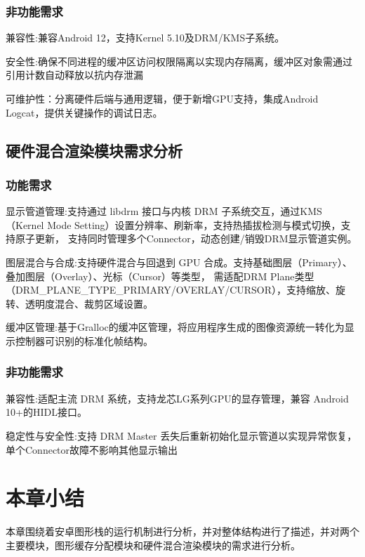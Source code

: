 \subsubsection{非功能需求}
        
    兼容性:兼容Android 12，支持Kernel 5.10及DRM/KMS子系统。
        
    安全性:​确保不同进程的缓冲区访问权限隔离以实现内存隔离，缓冲区对象需通过引用计数自动释放以抗内存泄漏

    可维护性：分离硬件后端与通用逻辑，便于新增GPU支持，集成Android Logcat，提供关键操作的调试日志。

\subsection{硬件混合渲染模块需求分析}

\subsubsection{功能需求}

显示管道管理​:支持通过 libdrm 接口与内核 DRM 子系统交互，通过KMS（Kernel Mode Setting）设置分辨率、刷新率，支持热插拔检测与模式切换，支持原子更新，
支持同时管理多个Connector，动态创建/销毁DRM显示管道实例。

​图层混合与合成​:支持硬件混合与回退到 GPU 合成。支持基础图层（Primary）、叠加图层（Overlay）、光标（Cursor）等类型，
需适配DRM Plane类型（DRM\_PLANE\_TYPE\_PRIMARY/OVERLAY/CURSOR），支持缩放、旋转、透明度混合、裁剪区域设置。

​缓冲区管理​:基于Gralloc的缓冲区管理，将应用程序生成的图像资源统一转化为显示控制器可识别的标准化帧结构。

\subsubsection{非功能需求}

​兼容性​:适配主流 DRM 系统，支持龙芯LG系列GPU的显存管理，兼容 Android 10+的HIDL接口。

稳定性与安全性:支持 DRM Master 丢失后重新初始化显示管道以实现异常恢复，单个Connector故障不影响其他显示输出

\section{本章小结}
本章围绕着安卓图形栈的运行机制进行分析，并对整体结构进行了描述，并对两个主要模块，图形缓存分配模块和硬件混合渲染模块的需求进行分析。


